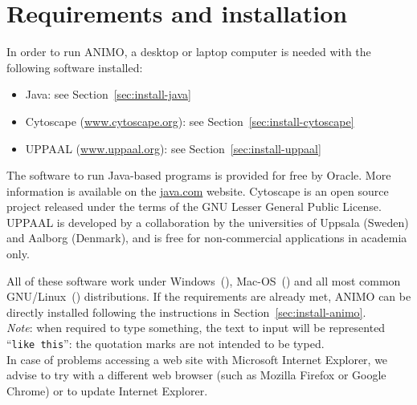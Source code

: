 \documentclass{article}
\newcommand{\winsymbol}{\raisebox{-0.8ex}{\pgfuseimage{win-logo}}}
\newcommand{\macsymbol}{\raisebox{-0.5ex}{\pgfuseimage{mac-logo}}}
\newcommand{\linuxsymbol}{\raisebox{-0.8ex}{\pgfuseimage{linux-logo}}}
\def\ta{Timed Automaton}
\def\tas{Timed Automata}
\begin{document}
\makeatother




\thispagestyle{empty}
\tableofcontents
\clearpage

\setcounter{page}{1}
\setcounter{section}{0}

\renewcommand\figurename{Figure}

\def\ta{TA}
\def\tas{TA}




\section{Requirements and installation}\label{sec:animo-installation}
In order to run ANIMO, a desktop or laptop computer is needed with the following software installed:
\begin{itemize}
  \item Java: see Section~\ref{sec:install-java}
  \item Cytoscape (\url{www.cytoscape.org}): see Section~\ref{sec:install-cytoscape}
  \item UPPAAL (\url{www.uppaal.org}): see Section~\ref{sec:install-uppaal}
\end{itemize}
The software to run Java-based programs is provided for free by Oracle. More information
is available on the \url{java.com} website.
Cytoscape is an open source project released under the terms of the GNU Lesser General Public License.
UPPAAL is developed by a collaboration by the universities of Uppsala (Sweden) and Aalborg (Denmark),
and is free for non-commercial applications in academia only.

All of these software work under Windows~(\winsymbol), Mac-OS~(\macsymbol) and all most common GNU/Linux~(\linuxsymbol) distributions.
If the requirements are already met, ANIMO can be directly installed following the instructions in Section~\ref{sec:install-animo}.\\
\emph{Note}: when required to type something, the text to input will be represented ``{\tt like this}'': the quotation marks
are not intended to be typed.\\
In case of problems accessing a web site with Microsoft Internet Explorer, we advise to try with a different web browser (such as Mozilla Firefox or
Google Chrome) or to update Internet Explorer.
\end{document}

